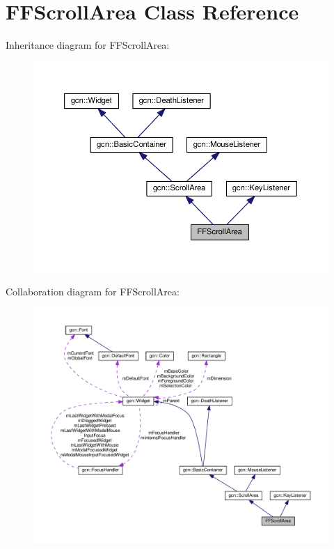 \hypertarget{classFFScrollArea}{}\section{F\+F\+Scroll\+Area Class Reference}
\label{classFFScrollArea}


Inheritance diagram for F\+F\+Scroll\+Area\+:\nopagebreak
\begin{figure}[H]
\begin{center}
\leavevmode
\includegraphics[width=350pt]{classFFScrollArea__inherit__graph}
\end{center}
\end{figure}


Collaboration diagram for F\+F\+Scroll\+Area\+:\nopagebreak
\begin{figure}[H]
\begin{center}
\leavevmode
\includegraphics[width=350pt]{classFFScrollArea__coll__graph}
\end{center}
\end{figure}
